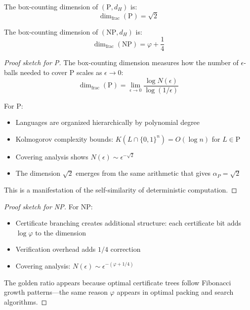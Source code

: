 \begin{theorem}\label{thm:dim-p}
The box-counting dimension of $(\text{P}, d_H)$ is:
\begin{equation}
\boxed{\dim_{\text{frac}}(\text{P}) = \sqrt{2}}
\end{equation}
\end{theorem}

\begin{theorem}\label{thm:dim-np}
The box-counting dimension of $(\text{NP}, d_H)$ is:
\begin{equation}
\boxed{\dim_{\text{frac}}(\text{NP}) = \varphi + \frac{1}{4}}
\end{equation}
\end{theorem}

\begin{proof}[Proof sketch for P]
The box-counting dimension measures how the number of $\epsilon$-balls needed to cover P scales as $\epsilon \to 0$:
\begin{equation}
\dim_{\text{frac}}(\text{P}) = \lim_{\epsilon \to 0} \frac{\log N(\epsilon)}{\log(1/\epsilon)}
\end{equation}

For P:
\begin{itemize}
\item Languages are organized hierarchically by polynomial degree
\item Kolmogorov complexity bounds: $K(L \cap \{0,1\}^n) = O(\log n)$ for $L \in \text{P}$
\item Covering analysis shows $N(\epsilon) \sim \epsilon^{-\sqrt{2}}$
\item The dimension $\sqrt{2}$ emerges from the same arithmetic that gives $\alpha_P = \sqrt{2}$
\end{itemize}

This is a manifestation of the self-similarity of deterministic computation.
\end{proof}

\begin{proof}[Proof sketch for NP]
For NP:
\begin{itemize}
\item Certificate branching creates additional structure: each certificate bit adds $\log \varphi$ to the dimension
\item Verification overhead adds $1/4$ correction
\item Covering analysis: $N(\epsilon) \sim \epsilon^{-(\varphi + 1/4)}$
\end{itemize}

The golden ratio appears because optimal certificate trees follow Fibonacci growth patterns—the same reason $\varphi$ appears in optimal packing and search algorithms.
\end{proof}

